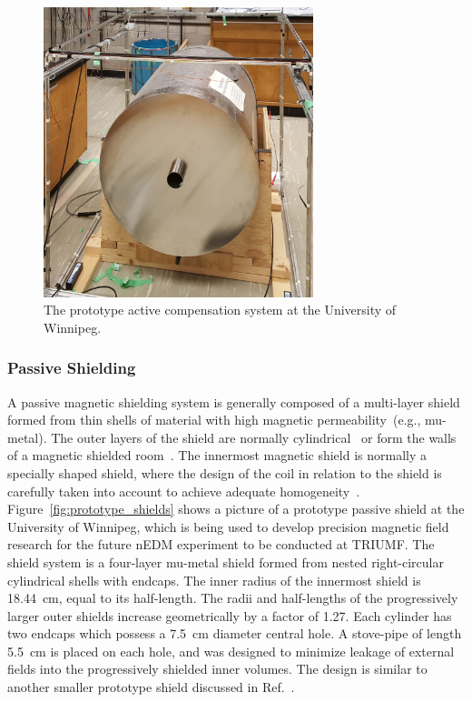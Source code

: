 \begin{figure}[h!]
  \centering
  \includegraphics[width=0.7\textwidth]{active_prototype.jpg}
  \caption[TUCAN's prototype active compensation system]{The prototype
    active compensation system at the University of Winnipeg.}
  \label{fig:prototype_active}
\end{figure}

\subsubsection{Passive Shielding}


A passive magnetic shielding system is generally composed of a
multi-layer shield formed from thin shells of material with high
magnetic permeability~(e.g., mu-metal).  The outer layers of the
shield are normally cylindrical~\cite{serebrov2014new,baker2011search}
or form the walls of a magnetic shielded
room~\cite{altarev2014magnetically,altarev2015minimizing}.  The
innermost magnetic shield is normally a specially shaped shield, where
the design of the coil in relation to the shield is carefully taken
into account to achieve adequate
homogeneity~\cite{Baker2006,Kirch_talk,altarev2012next}. Figure~\ref{fig:prototype_shields}
shows a picture of a prototype passive shield at the University of
Winnipeg, which is being used to develop precision magnetic field
research for the future nEDM experiment to be conducted at TRIUMF. The
shield system is a four-layer mu-metal shield formed from nested
right-circular cylindrical shells with endcaps.  The inner radius of
the innermost shield is 18.44~cm, equal to its half-length. The radii
and half-lengths of the progressively larger outer shields increase
geometrically by a factor of 1.27.  Each cylinder has two endcaps
which possess a 7.5~cm diameter central hole.  A stove-pipe of length
5.5~cm is placed on each hole, and was designed to minimize leakage of
external fields into the progressively shielded inner volumes.  The
design is similar to another smaller prototype shield discussed in
Ref.~\cite{martin2015large}.

